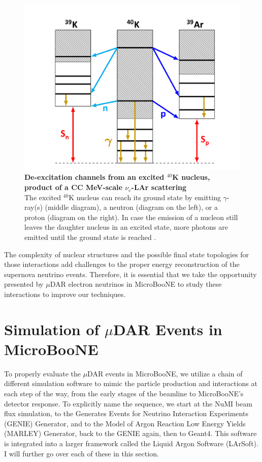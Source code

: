 \begin{figure}[h!]
    \centering
    \includegraphics[width=135mm]{Figures/40K_deexcitation.jpeg}
    \caption[De-excitation channels from an excited $^{40}$K nucleus, product of a CC MeV-scale $\nu_e$-LAr scattering]{{\textbf{De-excitation channels from an excited $^{40}$K nucleus, product of a CC MeV-scale $\nu_e$-LAr scattering}}\\  The excited $^{40}$K nucleus can reach its ground state by emitting $\gamma$-ray(s) (middle diagram), a neutron (diagram on the left), or a proton (diagram on the right). In case the emission of a nucleon still leaves the daughter nucleus in an excited state, more photons are emitted until the ground state is reached \cite{Gardiner_thesis}.}
    \label{40K_deexcite}
\end{figure}

The complexity of nuclear structures and the possible final state topologies for those interactions add challenges to the proper energy reconstruction of the supernova neutrino events. Therefore, it is essential that we take the opportunity presented by $\mu$DAR electron neutrinos in MicroBooNE to study these interactions to improve our techniques. 


\section{Simulation of $\mu$DAR Events in MicroBooNE}

To properly evaluate the $\mu$DAR events in MicroBooNE, we utilize a chain of different simulation software to mimic the particle production and interactions at each step of the way, from the early stages of the beamline to MicroBooNE's detector response. 
To explicitly name the sequence, we start at the NuMI beam flux simulation, to the Generates Events for Neutrino Interaction Experiments (GENIE) Generator, and to the Model of Argon Reaction Low Energy Yields (MARLEY) Generator, back to the GENIE again, then to Geant4. This software is integrated into a larger framework called the Liquid Argon Software (LArSoft). I will further go over each of these in this section. 

